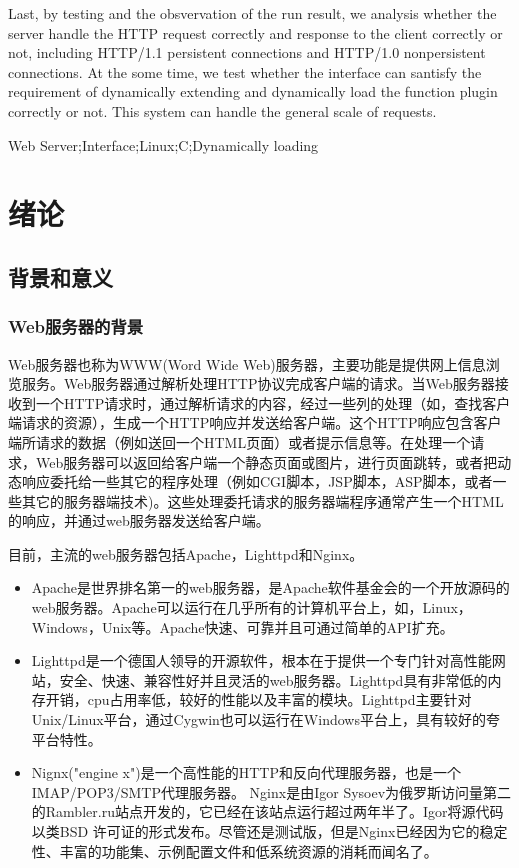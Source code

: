 \documentclass[twoside, xetex]{report}
\begin{document}
	Last, by testing and the obsvervation of the run result, we analysis whether the server handle the HTTP request correctly and response to the client correctly or not, including HTTP/1.1 persistent connections and HTTP/1.0 nonpersistent connections. At the some time, we test whether the interface can santisfy the requirement of dynamically extending and dynamically load the function plugin correctly or not. This system can handle the general scale of requests.


{\enkeywords Web Server;Interface;Linux;C;Dynamically loading}
\setcounter{page}{1}
\tableofcontents

\chapter{绪论}
\setcounter{page}{1}

\section{背景和意义}
\subsection{Web服务器的背景}
	Web服务器也称为WWW(Word Wide Web)服务器，主要功能是提供网上信息浏览服务。Web服务器通过解析处理HTTP协议完成客户端的请求。当Web服务器接收到一个HTTP请求时，通过解析请求的内容，经过一些列的处理（如，查找客户端请求的资源），生成一个HTTP响应并发送给客户端。这个HTTP响应包含客户端所请求的数据（例如送回一个HTML页面）或者提示信息等。在处理一个请求，Web服务器可以返回给客户端一个静态页面或图片，进行页面跳转，或者把动态响应委托给一些其它的程序处理（例如CGI脚本，JSP脚本，ASP脚本，或者一些其它的服务器端技术)。这些处理委托请求的服务器端程序通常产生一个HTML的响应，并通过web服务器发送给客户端。
	
	目前，主流的web服务器包括Apache，Lighttpd和Nginx。
	\begin{itemize}
		\item Apache是世界排名第一的web服务器，是Apache软件基金会的一个开放源码的web服务器。Apache可以运行在几乎所有的计算机平台上，如，Linux，Windows，Unix等。Apache快速、可靠并且可通过简单的API扩充。
		\item Lighttpd是一个德国人领导的开源软件，根本在于提供一个专门针对高性能网站，安全、快速、兼容性好并且灵活的web服务器。Lighttpd具有非常低的内存开销，cpu占用率低，较好的性能以及丰富的模块。Lighttpd主要针对Unix/Linux平台，通过Cygwin也可以运行在Windows平台上，具有较好的夸平台特性。
		\item Nignx("engine x")是一个高性能的HTTP和反向代理服务器，也是一个IMAP/POP3/SMTP代理服务器。 Nginx是由Igor Sysoev为俄罗斯访问量第二的Rambler.ru站点开发的，它已经在该站点运行超过两年半了。Igor将源代码以类BSD 许可证的形式发布。尽管还是测试版，但是Nginx已经因为它的稳定性、丰富的功能集、示例配置文件和低系统资源的消耗而闻名了。
	\end{itemize}
	
\end{document}
